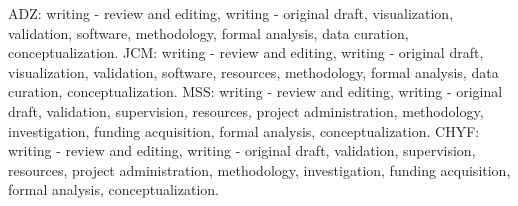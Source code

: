 ADZ: writing - review and editing, writing - original draft, visualization, validation, software, methodology, formal analysis, data curation, conceptualization. JCM: writing - review and editing, writing - original draft, visualization, validation, software, resources, methodology, formal analysis, data curation, conceptualization. MSS: writing - review and editing, writing - original draft, validation, supervision, resources, project administration, methodology, investigation, funding acquisition, formal analysis, conceptualization. CHYF: writing - review and editing, writing - original draft, validation, supervision, resources, project administration, methodology, investigation, funding acquisition, formal analysis, conceptualization.
